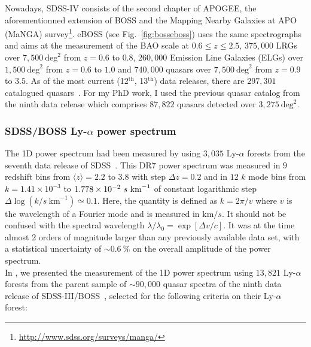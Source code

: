 Nowadays, SDSS-IV consists of the second chapter of APOGEE, the aforementionned extension of BOSS and the Mapping Nearby Galaxies at APO (MaNGA) survey\footnote{\url{http://www.sdss.org/surveys/manga/}}. eBOSS (see Fig.~\ref{fig:bosseboss}) uses the same spectrographs and aims at the measurement of the BAO scale at $0.6 \leqslant z \leqslant 2.5$, $375,000$ LRGs over $7,500~\mathrm{deg}^2$ from $z=0.6$ to $0.8$, $260,000$ Emission Line Galaxies (ELGs) over $1,500~\mathrm{deg}^2$ from $z=0.6$ to $1.0$ and $740,000$ quasars over $7,500~\mathrm{deg}^2$ from $z=0.9$ to $3.5$. As of the most current (12$^{\mathrm{th}}$, 13$^{\mathrm{th}}$) data releases, there are $297,301$ catalogued quasars~\citep{DR12Q_catalogue}. For my PhD work, I used the previous quasar catalog from the ninth data release \citep{DR9Q_catalogue} which comprises $87,822$ quasars detected over $3,275~\mathrm{deg}^2$. 




\subsubsection{SDSS/BOSS Ly-$\alpha$ power spectrum}

The 1D power spectrum had been measured by \cite{McDonald2006} using $3,035$ Ly-$\alpha$ forests from the seventh data release of SDSS~\citep{York2000, SDSSDR7}. This DR7 power spectrum was measured in $9$ redshift bins from $\langle z \rangle = 2.2$ to $3.8$ with step $\Delta z = 0.2$ and in $12$ $k$ mode bins from $k=1.41 \times 10^{-3}$ to $1.778 \times 10^{-2}~s~\rm{km}^{-1}$ of constant logarithmic step $\Delta \log (k/s~\mathrm{km}^{-1}) \simeq 0.1$. Here, the quantity is defined as $k = 2 \pi / v$ where $v$ is the wavelength of a Fourier mode and is measured in $\mathrm{km}/s$. It should not be confused with the spectral wavelength $\lambda/\lambda_0 = \exp \left[ \Delta v / c \right]$. It was at the time almost 2 orders of magnitude larger than any previously available data set, with a statistical uncertainty of $\sim 0.6~\%$ on the overall amplitude of the power spectrum. \\

In \cite{Palanque-Delabrouille2013}, we presented the measurement of the 1D power spectrum using $13,821$ Ly-$\alpha$ forests from the parent sample of $\sim 90,000$ quasar spectra of the ninth data release of SDSS-III/BOSS~\citep{Ahn2012, Dawson2012, Eisenstein2011, Gunn2006, Ross2012, Smee2013}, selected for the following criteria on their Ly-$\alpha$ forest: \\

